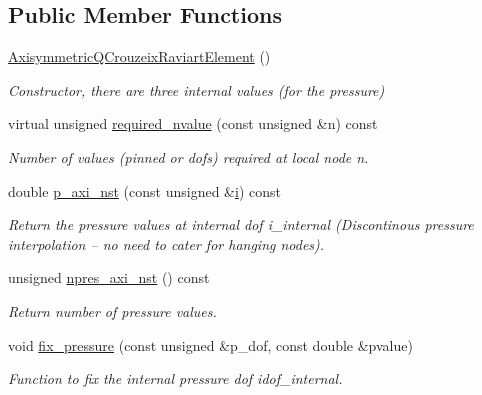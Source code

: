 \subsection*{Public Member Functions}
\begin{DoxyCompactItemize}
\item 
\hyperlink{classoomph_1_1AxisymmetricQCrouzeixRaviartElement_a971e34ee93385674ff784d9b1baf1871}{Axisymmetric\+Q\+Crouzeix\+Raviart\+Element} ()
\begin{DoxyCompactList}\small\item\em Constructor, there are three internal values (for the pressure) \end{DoxyCompactList}\item 
virtual unsigned \hyperlink{classoomph_1_1AxisymmetricQCrouzeixRaviartElement_ae7988679549e63ef87fc3f062fb6a559}{required\+\_\+nvalue} (const unsigned \&n) const
\begin{DoxyCompactList}\small\item\em Number of values (pinned or dofs) required at local node n. \end{DoxyCompactList}\item 
double \hyperlink{classoomph_1_1AxisymmetricQCrouzeixRaviartElement_acaa357820f2efb863d442b66e9761c6d}{p\+\_\+axi\+\_\+nst} (const unsigned \&\hyperlink{cfortran_8h_adb50e893b86b3e55e751a42eab3cba82}{i}) const
\begin{DoxyCompactList}\small\item\em Return the pressure values at internal dof i\+\_\+internal (Discontinous pressure interpolation -- no need to cater for hanging nodes). \end{DoxyCompactList}\item 
unsigned \hyperlink{classoomph_1_1AxisymmetricQCrouzeixRaviartElement_a923c2ccbc5bd523118273e63cc18fd5f}{npres\+\_\+axi\+\_\+nst} () const
\begin{DoxyCompactList}\small\item\em Return number of pressure values. \end{DoxyCompactList}\item 
void \hyperlink{classoomph_1_1AxisymmetricQCrouzeixRaviartElement_a65e65b5d7dd33b374c259b53dc99a83c}{fix\+\_\+pressure} (const unsigned \&p\+\_\+dof, const double \&pvalue)
\begin{DoxyCompactList}\small\item\em Function to fix the internal pressure dof idof\+\_\+internal. \end{DoxyCompactList}\item 

\end{DoxyCompactItemize}
